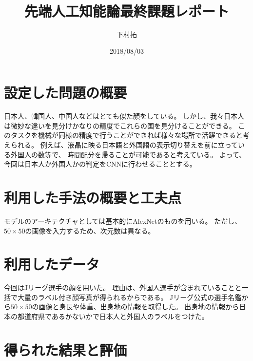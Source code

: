 \documentclass[uplatex]{jsarticle}
\begin{document}
\title{先端人工知能論最終課題レポート}
\author{下村拓}
\date{2018/08/03}
\maketitle


\section{設定した問題の概要}
日本人、韓国人、中国人などはとても似た顔をしている。
しかし、我々日本人は微妙な違いを見分けかなりの精度でこれらの国を見分けることができる。
このタスクを機械が同様の精度で行うことができれば様々な場所で活躍できると考えられる。
例えば、液晶に映る日本語と外国語の表示切り替えを前に立っている外国人の数等で、
時間配分を帰ることが可能であると考えている。
よって、今回は日本人か外国人かの判定をCNNに行わせることとする。


\section{利用した手法の概要と工夫点}
モデルのアーキテクチャとしては基本的にAlexNetのものを用いる。
ただし、$50\times50$の画像を入力するため、次元数は異なる。


\section{利用したデータ}
今回はJリーグ選手の顔を用いた。
理由は、外国人選手が含まれていることと一括で大量のラベル付き顔写真が得られるからである。
Jリーグ公式の選手名鑑から$50\times50$の画像と身長や体重、出身地の情報を取得した。
出身地の情報から日本の都道府県であるかないかで日本人と外国人のラベルをつけた。


\section{得られた結果と評価}
\end{document}
